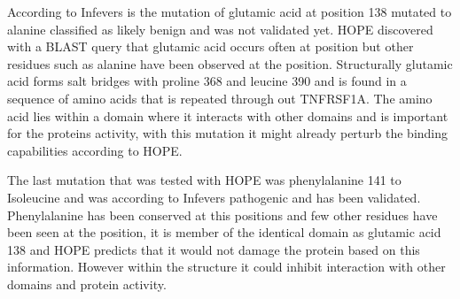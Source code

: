 	According to Infevers is the mutation of glutamic acid at position 138 mutated to alanine classified as likely benign and was not validated yet. HOPE discovered with a BLAST query that glutamic acid occurs often at position but other residues such as alanine have been observed at the position. Structurally glutamic acid forms salt bridges with proline  368 and leucine 390 and is found in a sequence of amino acids that is repeated through out TNFRSF1A. The amino acid lies within a domain where it interacts with other domains and is important for the proteins activity, with this mutation it might already perturb the binding capabilities according to HOPE.
	
	The last mutation that was tested with HOPE was phenylalanine 141 to Isoleucine and was according to Infevers pathogenic and has been validated. Phenylalanine has been conserved at this positions and few other residues have been seen at the position, it is member of the identical domain as glutamic acid 138 and HOPE predicts that it would not damage the protein based on this information. However within the structure it could inhibit interaction with other domains and protein activity.
	
	
%	
%	
%	
%	
%	
%	
%	
%	
%	
%	
%	
%		
%	

%
%
%



